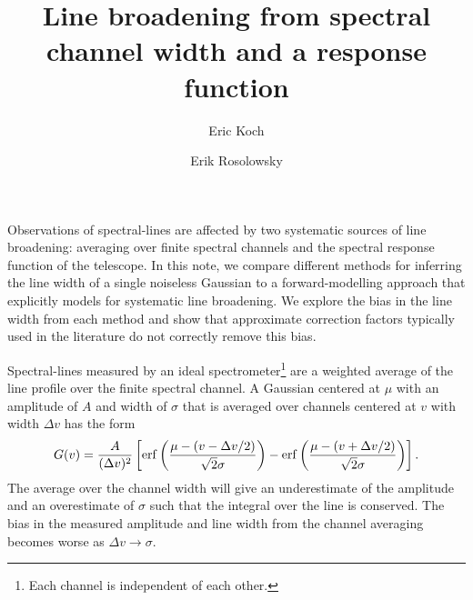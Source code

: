 \documentclass{rnaastex}
\begin{document}
\title{Line broadening from spectral channel width and a response function}

\author[0000-0001-9605-780X]{Eric Koch}
\author[0000-0002-5204-2259]{Erik Rosolowsky}


\keywords{}


\section{}

Observations of spectral-lines are affected by two systematic sources of line broadening: averaging over finite spectral channels and the spectral response function of the telescope. In this note, we compare different methods for inferring the line width of a single noiseless Gaussian to a forward-modelling approach that explicitly models for systematic line broadening.  We explore the bias in the line width from each method and show that approximate correction factors typically used in the literature do not correctly remove this bias.

Spectral-lines measured by an ideal spectrometer\footnote{Each channel is independent of each other.} are a weighted average of the line profile over the finite spectral channel. A Gaussian centered at $\mu$ with an amplitude of $A$ and width of $\sigma$ that is averaged over channels centered at $v$ with width $\Delta v$ has the form
\begin{equation}
    \label{eq:finite_gaussian}
    G(v) = \frac{A}{(\Delta v)^2} \left[ {\rm erf}\left( \frac{\mu - (v - \Delta v / 2)}{\sqrt{2}\sigma} \right) - {\rm erf}\left( \frac{\mu - (v + \Delta v / 2)}{\sqrt{2}\sigma} \right) \right].
\end{equation}
The average over the channel width will give an underestimate of the amplitude and an overestimate of $\sigma$ such that the integral over the line is conserved.  The bias in the measured amplitude and line width from the channel averaging becomes worse as $\Delta v \rightarrow \sigma$.
\end{document}
